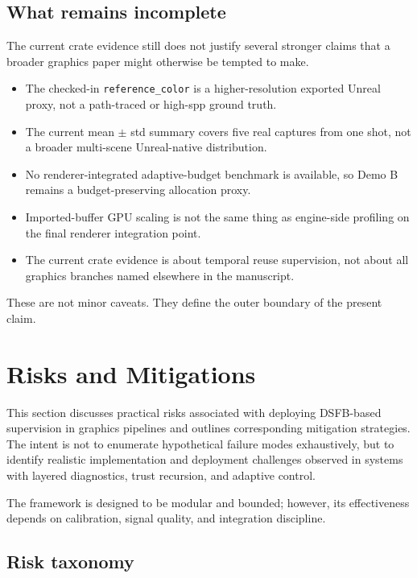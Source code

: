 \documentclass[11pt,letterpaper]{article}
\theoremstyle{gcresult}
\theoremstyle{definition}
\begin{document}
\subsection{What remains incomplete}

The current crate evidence still does not justify several stronger claims that a broader graphics paper might otherwise be tempted to make.
\begin{itemize}[leftmargin=1.5em]
    \item The checked-in \texttt{reference\_color} is a higher-resolution exported Unreal proxy, not a path-traced or high-spp ground truth.
    \item The current mean $\pm$ std summary covers five real captures from one shot, not a broader multi-scene Unreal-native distribution.
    \item No renderer-integrated adaptive-budget benchmark is available, so Demo B remains a budget-preserving allocation proxy.
    \item Imported-buffer GPU scaling is not the same thing as engine-side profiling on the final renderer integration point.
    \item The current crate evidence is about temporal reuse supervision, not about all graphics branches named elsewhere in the manuscript.
\end{itemize}

These are not minor caveats. They define the outer boundary of the present claim.

\section{Risks and Mitigations}
\label{sec:risks}

This section discusses practical risks associated with deploying DSFB-based supervision in graphics pipelines and outlines corresponding mitigation strategies. The intent is not to enumerate hypothetical failure modes exhaustively, but to identify realistic implementation and deployment challenges observed in systems with layered diagnostics, trust recursion, and adaptive control.

The framework is designed to be modular and bounded; however, its effectiveness depends on calibration, signal quality, and integration discipline.


\subsection{Risk taxonomy}
\end{document}
